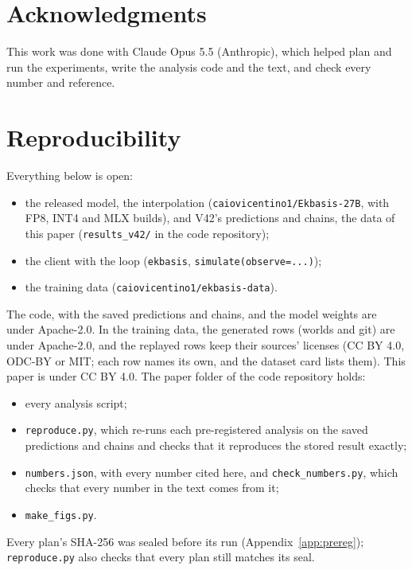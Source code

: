 \documentclass[11pt]{article}
\begin{document}
\section*{Acknowledgments}
This work was done with Claude Opus 5.5 (Anthropic), which helped plan and run the experiments, write the analysis code
and the text, and check every number and reference.

\section*{Reproducibility}
Everything below is open:
\begin{itemize}
  \item the released model, the interpolation (\texttt{caiovicentino1/Ekbasis-27B}, with FP8, INT4 and MLX builds),
  and V42's predictions and chains, the data of this paper (\texttt{results\_v42/} in the code repository);
  \item the client with the loop (\texttt{ekbasis}, \texttt{simulate(observe=...)});
  \item the training data (\texttt{caiovicentino1/ekbasis-data}).
\end{itemize}
The code, with the saved predictions and chains, and the model weights are under Apache-2.0. In the training data, the
generated rows (worlds and git) are under Apache-2.0, and the replayed rows keep their sources' licenses (CC BY 4.0,
ODC-BY or MIT; each row names its own, and the dataset card lists them). This paper is under CC BY 4.0.
The paper folder of the code repository holds:
\begin{itemize}
  \item every analysis script;
  \item \texttt{reproduce.py}, which re-runs each pre-registered analysis on the saved predictions and chains and checks
  that it reproduces the stored result exactly;
  \item \texttt{numbers.json}, with every number cited here, and \texttt{check\_numbers.py}, which checks that every
  number in the text comes from it;
  \item \texttt{make\_figs.py}.
\end{itemize}
Every plan's SHA-256 was sealed before its run (Appendix~\ref{app:prereg}); \texttt{reproduce.py} also checks that every
plan still matches its seal.

\appendix
\end{document}

